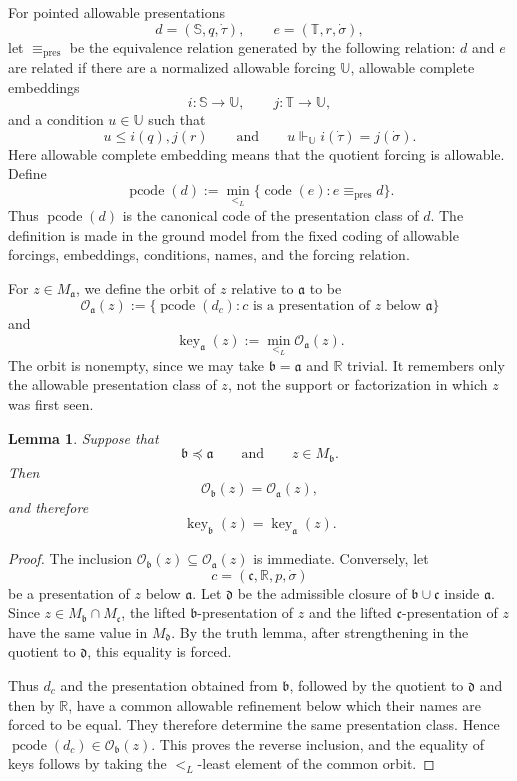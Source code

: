 \documentclass[a4paper,11pt]{article}
\newtheorem{lemma}[theorem]{Lemma}
\newcommand{\forceR}{\mathbb{R}}
\newcommand{\forceS}{\mathbb{S}}
\newcommand{\forceT}{\mathbb{T}}
\newcommand{\forceU}{\mathbb{U}}
\newcommand{\key}{\operatorname{key}}
\newcommand{\pcode}{\operatorname{pcode}}
\begin{document}
For pointed allowable presentations
\[
   d=(\forceS,q,\dot\tau),
   \qquad
   e=(\forceT,r,\dot\sigma),
\]
let $\equiv_{\mathrm{pres}}$ be the equivalence relation generated by the
following relation: $d$ and $e$ are related if there are a normalized
allowable forcing $\forceU$, allowable complete embeddings
\[
   i:\forceS\longrightarrow\forceU,
   \qquad
   j:\forceT\longrightarrow\forceU,
\]
and a condition $u\in\forceU$ such that
\[
   u\leq i(q),j(r)
   \qquad\text{and}\qquad
   u\Vdash_{\forceU} i(\dot\tau)=j(\dot\sigma).
\]
Here allowable complete embedding means that the quotient forcing is
allowable.  Define
\[
   \pcode(d)
   :=\min_{<_L}
      \{\operatorname{code}(e):e\equiv_{\mathrm{pres}} d\}.
\]
Thus $\pcode(d)$ is the canonical code of the presentation class of $d$.  The
definition is made in the ground model from the fixed coding of allowable
forcings, embeddings, conditions, names, and the forcing relation.

For $z\in M_{\mathfrak a}$, we define the orbit of $z$ relative to $\mathfrak a$ to be
\[
   \mathcal O_{\mathfrak a}(z)
   :=
   \{\pcode(d_c):c\text{ is a presentation of }z
      \text{ below }\mathfrak a\}
\]
and
\[
   \key_{\mathfrak a}(z)
   :=\min_{<_L}
      \mathcal O_{\mathfrak a}(z).
\]
The orbit is nonempty, since we may take $\mathfrak b=\mathfrak a$ and $\forceR$
trivial.  It remembers only the allowable presentation class of $z$, not the
support or factorization in which $z$ was first seen.

\begin{lemma}
\label{lemma-semantic-orbit-support-independence}
Suppose that
\[
   \mathfrak b\preccurlyeq\mathfrak a
   \qquad\text{and}\qquad
   z\in M_{\mathfrak b}.
\]
Then
\[
   \mathcal O_{\mathfrak b}(z)=\mathcal O_{\mathfrak a}(z),
\]
and therefore
\[
   \key_{\mathfrak b}(z)=\key_{\mathfrak a}(z).
\]
\end{lemma}

\begin{proof}
The inclusion $\mathcal O_{\mathfrak b}(z)\subseteq\mathcal O_{\mathfrak a}(z)$ is immediate.
Conversely, let
\[
   c=(\mathfrak c,\forceR,p,\dot\sigma)
\]
be a presentation of $z$ below $\mathfrak a$.  Let $\mathfrak d$ be the admissible
closure of $\mathfrak b\cup\mathfrak c$ inside $\mathfrak a$.  Since
$z\in M_{\mathfrak b}\cap M_{\mathfrak c}$, the lifted $\mathfrak b$-presentation
of $z$ and the lifted $\mathfrak c$-presentation of $z$ have the same value in
$M_{\mathfrak d}$.  By the truth lemma, after strengthening in the quotient to
$\mathfrak d$, this equality is forced.

Thus $d_c$ and the presentation obtained from $\mathfrak b$, followed by the
quotient to $\mathfrak d$ and then by $\forceR$, have a common allowable
refinement below which their names are forced to be equal.  They therefore
determine the same presentation class.  Hence
$\pcode(d_c)\in\mathcal O_{\mathfrak b}(z)$.  This proves the reverse
inclusion, and the equality of keys follows by taking the $<_L$-least
element of the common orbit.
\end{proof}
\end{document}
